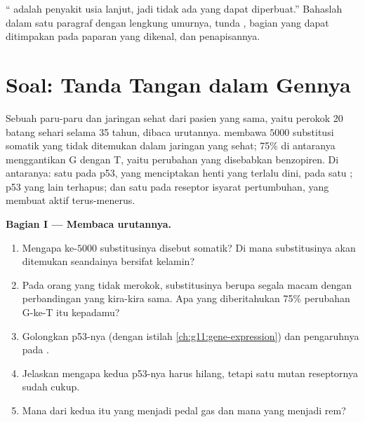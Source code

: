 \begin{exercise}[$\star\star\star$]\label{exo:g11:cancer:15}
`` adalah penyakit usia lanjut, jadi tidak ada yang dapat
diperbuat.'' Bahaslah dalam satu paragraf dengan lengkung umurnya,
tunda , bagian  yang dapat ditimpakan pada paparan
yang dikenal, dan penapisannya.
\end{exercise}

\section{Soal: Tanda Tangan dalam Gennya}

\begin{problem}
\label{pb:g11:cancer:1}
Sebuah  paru-paru dan jaringan sehat dari pasien yang sama, yaitu
perokok 20 batang sehari selama 35 tahun, dibaca urutannya. 
membawa $\num{5000}$ substitusi somatik yang tidak ditemukan dalam
jaringan yang sehat; 75\% di antaranya menggantikan G dengan T, yaitu
perubahan yang disebabkan benzopiren. Di antaranya: satu pada  p53,
yang menciptakan henti yang terlalu dini, pada satu ;  p53 yang
lain terhapus; dan satu pada  reseptor isyarat pertumbuhan, yang
membuat  aktif terus-menerus.

\medskip
\noindent\textbf{Bagian I --- Membaca urutannya.}
\begin{enumerate}
  \item Mengapa ke-$\num{5000}$ substitusinya disebut somatik? Di mana
        substitusinya akan ditemukan seandainya bersifat  kelamin?
  \item Pada  orang yang tidak merokok, substitusinya berupa
        segala macam dengan perbandingan yang kira-kira sama. Apa yang
        diberitahukan 75\% perubahan G-ke-T itu kepadamu?
  \item Golongkan  p53-nya (dengan istilah
        \cref{ch:g11:gene-expression}) dan pengaruhnya pada .
  \item Jelaskan mengapa kedua  p53-nya harus hilang, tetapi satu
         mutan  reseptornya sudah cukup.
  \item Mana dari kedua  itu yang menjadi pedal gas dan mana yang menjadi rem?
\end{enumerate}


\end{problem}
